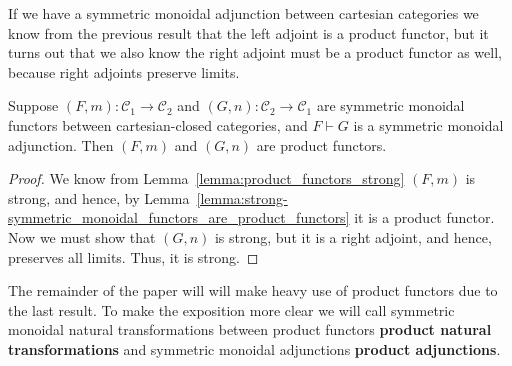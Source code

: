 \documentclass{article}
\let\to\rightarrow
\newcommand{\cat}[1]{\mathcal{#1}}
\begin{document}
If we have a symmetric monoidal adjunction between cartesian
categories we know from the previous result that the left adjoint is a
product functor, but it turns out that we also know the right adjoint
must be a product functor as well, because right adjoints preserve
limits.

\begin{lemma}
  \label{lemma:adjoint-CCC-prod-func}
  Suppose $(F,m) : \cat{C}_1 \to \cat{C}_2$ and $(G,n) : \cat{C}_2 \to
  \cat{C}_1$ are symmetric monoidal functors between cartesian-closed
  categories, and $F \vdash G$ is a symmetric monoidal adjunction.
  Then $(F,m)$ and $(G,n)$ are product functors.
\end{lemma}
\begin{proof}
  We know from Lemma~\ref{lemma:product_functors_strong} $(F,m)$ is
  strong, and hence, by
  Lemma~\ref{lemma:strong-symmetric_monoidal_functors_are_product_functors}
  it is a product functor.  Now we must show that $(G,n)$ is strong,
  but it is a right adjoint, and hence, preserves all limits.  Thus,
  it is strong.
\end{proof}
\noindent
The remainder of the paper will will make heavy use of product
functors due to the last result.  To make the exposition more clear we
will call symmetric monoidal natural transformations between product
functors \textbf{product natural transformations} and symmetric
monoidal adjunctions \textbf{product adjunctions}.
\end{document}
